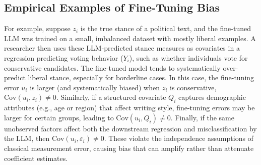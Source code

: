 \documentclass[11pt]{article}
\begin{document}
\subsection{Empirical Examples of Fine-Tuning Bias}

For example, suppose $z_i$ is the true stance of a political text, 
and the fine-tuned LLM was trained on a small, imbalanced dataset with mostly liberal examples. 
A researcher then uses these LLM-predicted stance measures as covariates in a regression predicting voting behavior ($Y_i$), 
such as whether individuals vote for conservative candidates. 
The fine-tuned model tends to systematically over-predict liberal stance, 
especially for borderline cases. In this case, the fine-tuning error $u_i$ is larger (and systematically biased) 
when $z_i$ is conservative, $\text{Cov}(u_i, z_i) \neq 0$. 
Similarly, if a structured covariate $Q_i$ captures demographic attributes (e.g., age or region) that affect writing style, 
fine-tuning errors may be larger for certain groups, leading to $\text{Cov}(u_i, Q_i) \neq 0$. 
Finally, if the same unobserved factors affect both the downstream regression and misclassification by the LLM, 
then $\text{Cov}(u_i, \varepsilon_i) \neq 0$. 
These violate the independence assumptions of classical measurement error, 
causing bias that can amplify rather than attenuate coefficient estimates.
\end{document}
